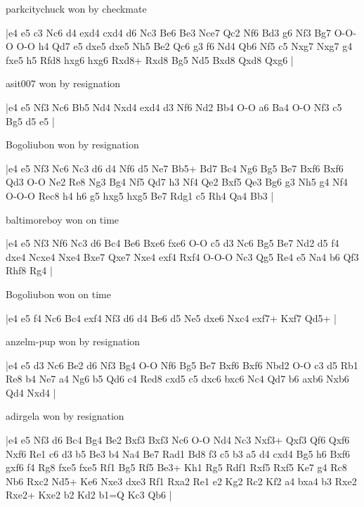 \showboard

parkcitychuck won by checkmate

\makegametitle
|e4 e5 c3 Nc6 d4 exd4 cxd4 d6 Nc3 Be6 Be3 Nce7 Qc2 Nf6 Bd3 g6 Nf3 Bg7 O-O-O O-O h4 Qd7 e5 dxe5 dxe5 Nh5 Be2 Qc6 g3 f6 Nd4 Qb6 Nf5 c5 Nxg7 Nxg7 g4 fxe5 h5 Rfd8 hxg6 hxg6 Rxd8+ Rxd8 Bg5 Nd5 Bxd8 Qxd8 Qxg6  |

\showboard

asit007 won by resignation

\makegametitle
|e4 e5 Nf3 Nc6 Bb5 Nd4 Nxd4 exd4 d3 Nf6 Nd2 Bb4 O-O a6 Ba4 O-O Nf3 c5 Bg5 d5 e5  |

\showboard

Bogoliubon won by resignation

\makegametitle
|e4 e5 Nf3 Nc6 Nc3 d6 d4 Nf6 d5 Ne7 Bb5+ Bd7 Bc4 Ng6 Bg5 Be7 Bxf6 Bxf6 Qd3 O-O Ne2 Re8 Ng3 Bg4 Nf5 Qd7 h3 Nf4 Qe2 Bxf5 Qe3 Bg6 g3 Nh5 g4 Nf4 O-O-O Rec8 h4 h6 g5 hxg5 hxg5 Be7 Rdg1 c5 Rh4 Qa4 Bb3  |

\showboard

baltimoreboy won on time

\makegametitle
|e4 e5 Nf3 Nf6 Nc3 d6 Bc4 Be6 Bxe6 fxe6 O-O c5 d3 Nc6 Bg5 Be7 Nd2 d5 f4 dxe4 Ncxe4 Nxe4 Bxe7 Qxe7 Nxe4 exf4 Rxf4 O-O-O Nc3 Qg5 Re4 e5 Na4 b6 Qf3 Rhf8 Rg4  |

\showboard

Bogoliubon won on time

\makegametitle
|e4 e5 f4 Nc6 Bc4 exf4 Nf3 d6 d4 Be6 d5 Ne5 dxe6 Nxc4 exf7+ Kxf7 Qd5+  |

\showboard

anzelm-pup won by resignation

\makegametitle
|e4 e5 d3 Nc6 Be2 d6 Nf3 Bg4 O-O Nf6 Bg5 Be7 Bxf6 Bxf6 Nbd2 O-O c3 d5 Rb1 Re8 b4 Ne7 a4 Ng6 b5 Qd6 c4 Red8 cxd5 c5 dxc6 bxc6 Nc4 Qd7 b6 axb6 Nxb6 Qd4 Nxd4  |

\showboard

adirgela won by resignation

\makegametitle
|e4 e5 Nf3 d6 Bc4 Bg4 Be2 Bxf3 Bxf3 Nc6 O-O Nd4 Nc3 Nxf3+ Qxf3 Qf6 Qxf6 Nxf6 Re1 c6 d3 b5 Be3 b4 Na4 Be7 Rad1 Bd8 f3 c5 b3 a5 d4 cxd4 Bg5 h6 Bxf6 gxf6 f4 Rg8 fxe5 fxe5 Rf1 Bg5 Rf5 Be3+ Kh1 Rg5 Rdf1 Rxf5 Rxf5 Ke7 g4 Rc8 Nb6 Rxc2 Nd5+ Ke6 Nxe3 dxe3 Rf1 Rxa2 Re1 e2 Kg2 Rc2 Kf2 a4 bxa4 b3 Rxe2 Rxe2+ Kxe2 b2 Kd2 b1=Q Kc3 Qb6  |


